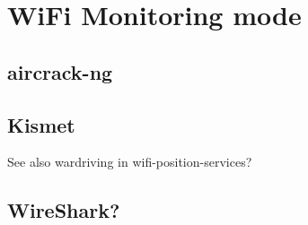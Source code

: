 \documentclass[../wifi-security.tex]{subfiles}
\begin{document}
\chapter{WiFi Monitoring mode}




\section{aircrack-ng}




\section{Kismet}




See also wardriving in wifi-position-services?

\section{WireShark?}



\end{document}
